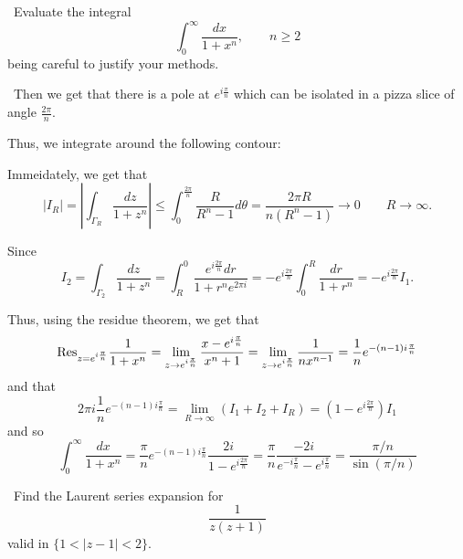\documentclass[12pt]{Qual}
\begin{document}
\begin{problem} $\,$
Evaluate the integral $$\int_0^\infty\frac{dx}{1+x^n},\qquad n\ge2$$ being careful to justify your methods.
\end{problem}


\begin{solution}$\,$
Then we get that there is a pole at $e^{i\frac{\pi}{n}}$ which can be isolated in a pizza slice of angle $\frac{2\pi}{n}$.

Thus, we integrate around the following contour:
\begin{center}
\end{center}

Immeidately, we get that $$|I_R|=\left|\int_{\Gamma_R}\frac{dz}{1+z^n}\right|\le\int_0^{\frac{2\pi}{n}}\frac{R}{R^n-1}d\theta=\frac{2\pi R}{n(R^n-1)}\to0\qquad R\to\infty.$$

Since $$I_2=\int_{\Gamma_2}\frac{dz}{1+z^n}=\int_R^0\frac{e^{i\frac{2\pi}{n}}dr}{1+r^ne^{2\pi i}}=-e^{i\frac{2\pi}{n}}\int_0^R\frac{dr}{1+r^n}=-e^{i\frac{2\pi}{n}}I_1.$$

Thus, using the residue theorem, we get that $$\text{Res}_{z=e^{i\frac{\pi}{n}}}\frac{1}{1+x^n}=\lim_{z\to e^{i\frac{\pi}{n}}}\frac{x-e^{i\frac{\pi}{n}}}{x^n+1}=\lim_{z\to e^{i\frac{\pi}{n}}}\frac{1}{nx^{n-1}}=\frac{1}{n}e^{-(n-1)i\frac{\pi}{n}}$$ and that $$2\pi i\frac{1}{n}e^{-(n-1)i\frac{\pi}{n}}=\lim_{R\to\infty}(I_1+I_2+I_R)=(1-e^{i\frac{2\pi}{n}})I_1$$ and so $$\int_0^\infty\frac{dx}{1+x^n}= \frac{\pi}{n}e^{-(n-1)i\frac{\pi}{n}}\frac{2i}{1-e^{i\frac{2\pi}{n}}}=\frac{\pi}{n}\frac{-2i}{e^{-i\frac{\pi}{n}}-e^{i\frac{\pi}{n}}}=\frac{\pi/n}{\sin(\pi/n)}$$
\end{solution}
\newpage

\begin{problem} $\,$
Find the Laurent series expansion for $$\frac{1}{z(z+1)}$$ valid in $\{1<|z-1|<2\}.$
\end{problem}
\end{document}
